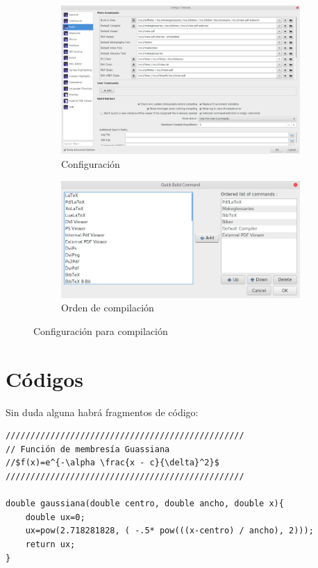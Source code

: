 \begin{figure}[!htbp]
	\centering
	\begin{subfigure}[b]{0.41\textwidth}
		\includegraphics[width=\textwidth]{img/1.png}
		\caption{Configuración}
		\label{fig:2}
	\end{subfigure}
	\begin{subfigure}[b]{0.52\textwidth}
		\includegraphics[width=\textwidth]{img/2.png}
		\caption{Orden de compilación}
		\label{fig:3}
	\end{subfigure}
	\caption{Configuración para compilación}
	\label{fig:compile}
\end{figure}

\section{Códigos}

Sin duda alguna habrá fragmentos de código:

\begin{mdframed}[linecolor=black, topline=false, bottomline=false, leftline=false, rightline=false, userdefinedwidth=\textwidth]
\label{cod:gauss}
\vspace{-0.3cm} %
\begin{verbatim}
////////////////////////////////////////////////
// Función de membresía Guassiana 
//$f(x)=e^{-\alpha \frac{x - c}{\delta}^2}$
////////////////////////////////////////////////

double gaussiana(double centro, double ancho, double x){
	double ux=0;
	ux=pow(2.718281828, ( -.5* pow(((x-centro) / ancho), 2)));
	return ux;
}
\end{verbatim}
\end{mdframed}

